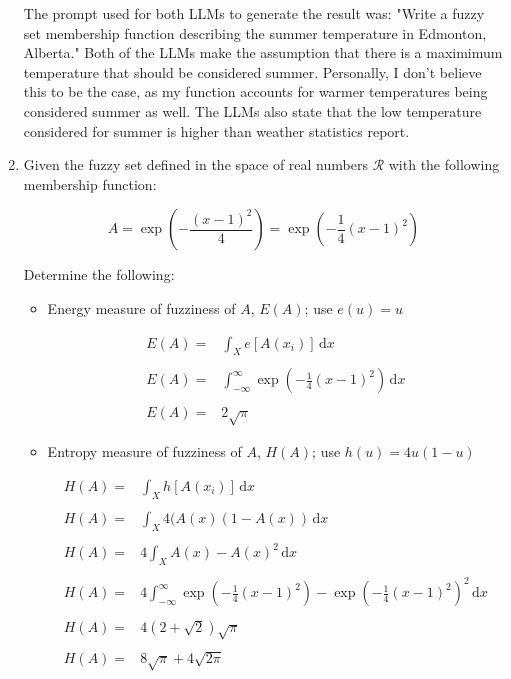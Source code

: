\documentclass{article}
\begin{document}
\begin{enumerate}
	The prompt used for both LLMs to generate the result was: "Write a fuzzy set membership function describing the summer temperature in Edmonton, Alberta." Both of the LLMs make the assumption that there is a maximimum temperature that should be considered summer. Personally, I don't believe this to be the case, as my function accounts for warmer temperatures being considered summer as well. The LLMs also state that the low temperature considered for summer is higher than weather statistics report.
	
	\item Given the fuzzy set defined in the space of real numbers $\mathcal{R}$ with the following membership function:
	
	\[
		A = \exp (-\frac{(x-1)^2}{4}) = \exp(-\frac1 4(x - 1)^2)
	\]
	
	Determine the following:
	\begin{itemize}
		\item Energy measure of fuzziness of $A$, $E(A)$; use $e(u) = u$
		
		\[
			\begin{matrix}
				E(A) =& \int_X e[A(x_i)] \, \text{d}x \\
				\\
				E(A) =& \int_{-\infty}^{\infty} \exp(-\frac{1}{4} (x - 1)^2) \, \text{d}x \\
				\\
				E(A) =& 2 \sqrt \pi
			\end{matrix}
		\]
		
		\item Entropy measure of fuzziness of $A$, $H(A)$; use $h(u) = 4u(1 - u)$

		\[
			\begin{matrix}
				H(A) =& \int_X h[A(x_i)] \, \text{d} x \\
				\\
				H(A) =& \int_X 4(A(x)(1-A(x)) \, \text{d} x \\
				\\
				H(A) =& 4 \int_X A(x)-A(x)^2 \, \text{d} x \\
				\\
				H(A) =& 4 \int_{-\infty}^{\infty} \exp(-\frac1 4(x - 1)^2)-\exp(-\frac1 4(x - 1)^2)^2 \, \text{d} x \\
				\\
				H(A) =& 4(2 + \sqrt2)\sqrt\pi \\
				\\
				H(A) =& 8\sqrt\pi + 4\sqrt{2\pi}
			\end{matrix}
		\]


\end{itemize}
\end{enumerate}
\end{document}
